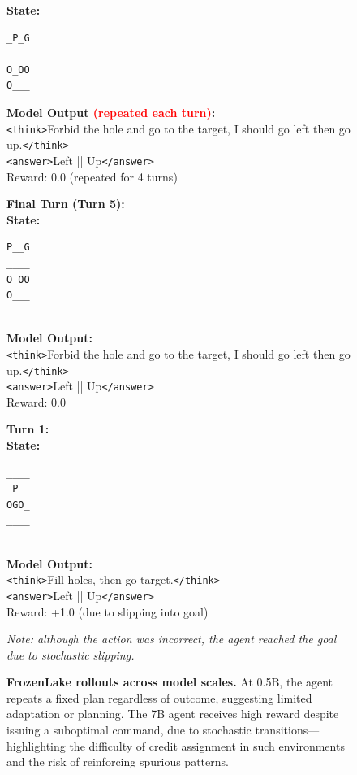 \begin{figure}[t]
\centering
\small
\begin{tcolorbox}[colback=gray!2, colframe=black, boxrule=0.5pt, arc=2pt, width=0.95\linewidth, title=0.5B FrozenLake – Multi-Turn Rollout]
\textbf{State:}
\begin{verbatim}
_P_G
____
O_OO
O___
\end{verbatim}

\textbf{Model Output \textcolor{red}{(repeated each turn)}:} \\
\texttt{<think>}Forbid the hole and go to the target, I should go left then go up.\texttt{</think>} \\
\texttt{<answer>}Left || Up\texttt{</answer>} \\
Reward: 0.0 (repeated for 4 turns)

\vspace{4pt}
\textbf{Final Turn (Turn 5):} \\
\textbf{State:}
\begin{verbatim}
P__G
____
O_OO
O___
\end{verbatim} \\
\textbf{Model Output:} \\
\texttt{<think>}Forbid the hole and go to the target, I should go left then go up.\texttt{</think>} \\
\texttt{<answer>}Left || Up\texttt{</answer>} \\
Reward: 0.0
\end{tcolorbox}
\vspace{4pt}
\begin{tcolorbox}[colback=gray!2, colframe=black, boxrule=0.5pt, arc=2pt, width=0.95\linewidth, title=7B FrozenLake – Multi-Turn Rollout]
\textbf{Turn 1:} \\
\textbf{State:}
\begin{verbatim}
____
_P__
OGO_
____
\end{verbatim} \\
\textbf{Model Output:} \\
\texttt{<think>}Fill holes, then go target.\texttt{</think>} \\
\texttt{<answer>}Left || Up\texttt{</answer>} \\
Reward: +1.0 (due to slipping into goal)

\textit{Note: although the action was incorrect, the agent reached the goal due to stochastic slipping.}
\end{tcolorbox}
\caption{\textbf{FrozenLake rollouts across model scales.} At 0.5B, the agent repeats a fixed plan regardless of outcome, suggesting limited adaptation or planning. The 7B agent receives high reward despite issuing a suboptimal command, due to stochastic transitions—highlighting the difficulty of credit assignment in such environments and the risk of reinforcing spurious patterns.}
\label{fig:frozenlake-multiscale}
\vspace{-10pt}
\end{figure}





